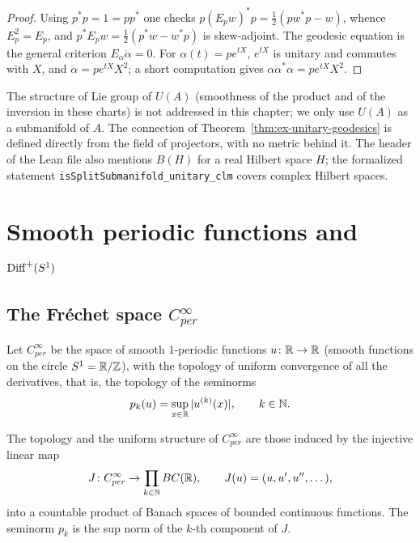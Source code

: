 \begin{proof}
  \leanok
  Using $p^*p = 1 = pp^*$ one checks $p (E_p w)^* p = \tfrac12(p w^* p - w)$, whence
  $E_p^2 = E_p$, and $p^* E_p w = \tfrac12(p^* w - w^* p)$ is skew-adjoint. The geodesic
  equation is the general criterion $E_{\alpha}\ddot\alpha = 0$. For $\alpha(t) = p e^{tX}$,
  $e^{tX}$ is unitary and commutes with $X$, and $\ddot\alpha = p e^{tX}X^2$; a short
  computation gives $\alpha\ddot\alpha^*\alpha = p e^{tX} X^2$.
\end{proof}

\begin{remark}
  The structure of Lie group of $U(A)$ (smoothness of the product and of the inversion in these
  charts) is not addressed in this chapter; we only use $U(A)$ as a submanifold of $A$. The
  connection of Theorem~\ref{thm:ex-unitary-geodesics} is defined directly from the field of
  projectors, with no metric behind it. The header of the Lean file also mentions $B(H)$ for a
  real Hilbert space $H$; the formalized statement \texttt{isSplitSubmanifold\_unitary\_clm}
  covers complex Hilbert spaces.
\end{remark}

\section{Smooth periodic functions and \texorpdfstring{$\operatorname{Diff}^+(S^1)$}{Diff+(S1)}}

\subsection{The Fréchet space \texorpdfstring{$C^\infty_{per}$}{C-infinity-per}}

Let $C^\infty_{per}$ be the space of smooth $1$-periodic functions $u \colon \mathbb{R} \to \mathbb{R}$ (smooth
functions on the circle $S^1 = \mathbb{R}/\mathbb Z$), with the topology of uniform convergence of all
the derivatives, that is, the topology of the seminorms
\[
  p_k(u) = \sup_{x \in \mathbb{R}} |u^{(k)}(x)|, \qquad k \in \mathbb{N} .
\]

\begin{definition}
  \label{def:ex-cinfper}
  \leanok
  The topology and the uniform structure of $C^\infty_{per}$ are those induced by the injective
  linear map
  \[
    J \colon C^\infty_{per} \to \prod_{k \in \mathbb{N}} BC(\mathbb{R}), \qquad J(u) = (u, u', u'', \dots),
  \]
  into a countable product of Banach spaces of bounded continuous functions. The seminorm $p_k$
  is the sup norm of the $k$-th component of $J$.
\end{definition}

